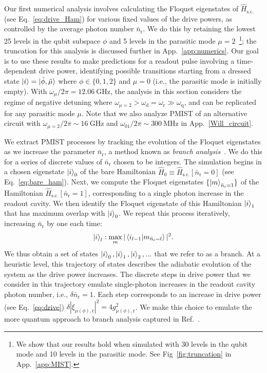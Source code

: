 \documentclass[%
reprint,
superscriptaddress,
 amsmath,amssymb,
 aps,
 prx,
longbibliography,
floatfix,
]{revtex4-2}
\begin{document}
Our first numerical analysis involves calculating the Floquet eigenstates of $\hat H_\textrm{s.c.}$ (see Eq.~\ref{eq:drive_Ham}) for various fixed values of the drive powers, as controlled by the average photon number $\bar n_\textrm{r}$. We do this by retaining the lowest 25 levels in the qubit subspace $\phi$ and 5 levels in the parasitic mode $\mu=2$~\footnote{We show that our results hold when simulated with 30 levels in the qubit mode and 10 levels in the parasitic mode. See Fig~\ref{fig:truncation} in App.~\ref{app:MIST}.}; the truncation for this analysis is discussed further in App.~\ref{app:numerics}. Our goal is to use these results to make predictions for a readout pulse involving a time-dependent drive power, identifying possible transitions starting from a dressed state $\ket{i} =\ket{\tilde{\phi}, \tilde{\mu}}$ where $\phi\in\{0,1,2\}$ and $\mu=0$ (i.e., the parasitic mode is initially empty). With $\omega_\mu/2\pi=12.06 \ \mathrm{GHz}$, the analysis in this section considers the regime of negative detuning where $\omega_{\mu=2}>\omega_\textrm{d}=\omega_\textrm{r} \gg \omega_\textrm{q}$, and can be replicated for any parasitic mode $\mu$. Note that we also analyze PMIST of an alternative circuit with $\omega_{\mu=2}/2\pi\sim 16 \ \mathrm{GHz}$ and $\omega_{01}/2\pi\sim 300 \ \mathrm{MHz}$ in App.~\ref{Will_circuit}.

We extract PMIST processes by tracking the evolution of the Floquet eigenstates as we increase the parameter $\bar{n}_\textrm{r}$, a method known as \emph{branch analysis}~\cite{dumas2024unified,cohen2023reminiscence}. We do this for a series of discrete values of $\bar{n}_\textrm{r}$ chosen to be integers. The simulation begins in a chosen eigenstate $\ket{i}_0$ of the bare Hamiltonian $\hat{H}_0 \equiv \hat{H}_\textrm{s.c.}[\bar{n}_\mathrm{r}=0]$ (see Eq.~\ref{eq:bare_ham}). Next, we compute the Floquet eigenstates $\{\ket{m}_{\bar n_\textrm{r}=1}\}$ of the Hamiltonian $\hat{H}_\textrm{s.c.}[\bar{n}_\textrm{r}=1]$, corresponding to a single photon increase in the readout cavity. We then identify the Floquet eigenstate of this Hamiltonian $\ket{i}_1$ that has maximum overlap with $\ket{i}_0$. We repeat this process iteratively, increasing $\bar{n}_\textrm{r}$ by one each time:
\begin{align}
\ket{i}_l:\max_{m}|\braket{i_{l-1}|{m}_{\bar n_\textrm{r}=l}}|^2.\label{eq:track_Floquet}   
\end{align}
We thus obtain a set of states $\ket{i}_0,\ket{i}_1,\ket{i}_2,...$ that we refer to as a branch. At a heuristic level, this trajectory of states describes the adiabatic evolution of the system as the drive power increases. The discrete steps in drive power that we consider in this trajectory emulate single-photon increases in the readout cavity photon number, i.e., $\delta \bar n_\textrm{r}=1$. Each step corresponds to an increase in drive power (see Eq.~\ref{eq:drive}) $\delta |\xi_{\mu (\phi),\textrm{r}}|^2=4g_{\mu (\phi),\textrm{r}}^2$. We make this choice to emulate the more quantum approach to branch analysis captured in Ref.~\cite{shillito2022dynamics,dumas2024unified}.
\end{document}
